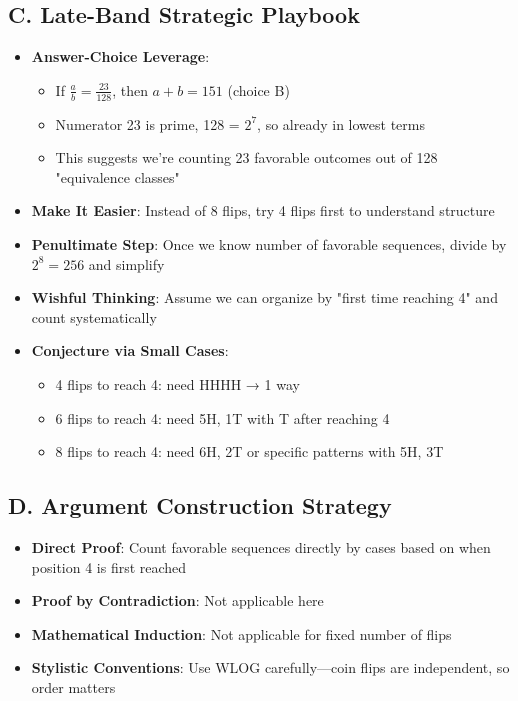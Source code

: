\documentclass[]{article}
\begin{document}
\begin{strategicbox}
\subsection*{C. Late-Band Strategic Playbook}
\begin{itemize}[leftmargin=*]
    \item \textbf{Answer-Choice Leverage}: 
    \begin{itemize}
        \item If $\frac{a}{b} = \frac{23}{128}$, then $a+b = 151$ (choice B)
        \item Numerator 23 is prime, 128 = $2^7$, so already in lowest terms
        \item This suggests we're counting 23 favorable outcomes out of 128 "equivalence classes"
    \end{itemize}
    \item \textbf{Make It Easier}: Instead of 8 flips, try 4 flips first to understand structure
    \item \textbf{Penultimate Step}: Once we know number of favorable sequences, divide by $2^8 = 256$ and simplify
    \item \textbf{Wishful Thinking}: Assume we can organize by "first time reaching 4" and count systematically
    \item \textbf{Conjecture via Small Cases}: 
    \begin{itemize}
        \item 4 flips to reach 4: need HHHH → 1 way
        \item 6 flips to reach 4: need 5H, 1T with T after reaching 4
        \item 8 flips to reach 4: need 6H, 2T or specific patterns with 5H, 3T
    \end{itemize}
\end{itemize}

\subsection*{D. Argument Construction Strategy}
\begin{itemize}[leftmargin=*]
    \item \textbf{Direct Proof}: Count favorable sequences directly by cases based on when position 4 is first reached
    \item \textbf{Proof by Contradiction}: Not applicable here
    \item \textbf{Mathematical Induction}: Not applicable for fixed number of flips
    \item \textbf{Stylistic Conventions}: Use WLOG carefully—coin flips are independent, so order matters
\end{itemize}


\end{strategicbox}
\end{document}
